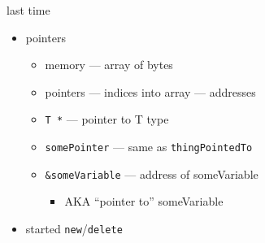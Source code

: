 \begin{comment}
\begin{frame}{last time}
    \begin{itemize}
    \item classes
        \begin{itemize}
        \item declarations in {\tt .h} file
        \item {\tt ClassName::method}
        \item {\tt class ... \{...\}\myemph{;}}
        \item {\tt const}, {\tt static}
        \end{itemize}
    \item objects --- values, not references
        \begin{itemize}
        \item {\tt return Foo(1)} --- {\tt Foo(1)} is temporary Foo object
        \item {\tt x = y} --- copy {\tt x} into {\tt y}
        \end{itemize}
    \item the preprocessor --- {\tt \#define}, {\tt \#include}, etc.
    \item started pointers
    \end{itemize}
\end{frame}
\end{comment}

\begin{frame}{last time}
    \begin{itemize}
    \item pointers
        \begin{itemize}
        \item memory --- array of bytes
        \item pointers --- indices into array --- addresses
        \item {\tt T *} --- pointer to T type
        \item {\tt *somePointer} --- same as {\tt thingPointedTo}
        \item {\tt \&someVariable} --- address of someVariable
            \begin{itemize}
            \item AKA ``pointer to'' someVariable
            \end{itemize}
        \end{itemize}
    \item started {\tt new}/{\tt delete}
    \end{itemize}
\end{frame}

